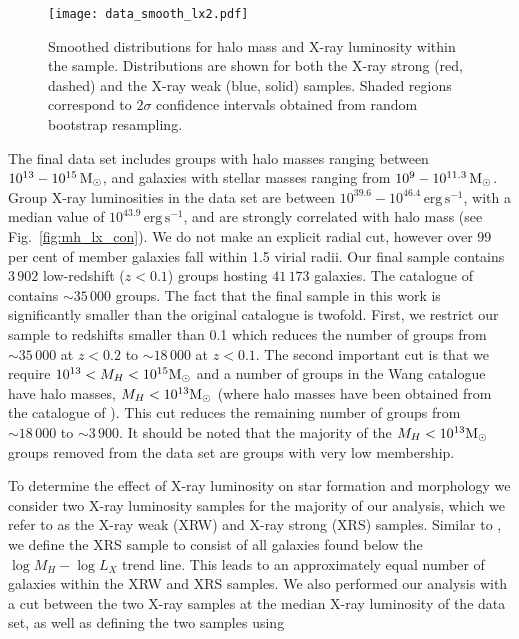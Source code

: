 \begin{figure}[!ht]
  \centering
  \texttt{[image: data\_smooth\_lx2.pdf]}
  \caption{Smoothed distributions for halo mass and X-ray luminosity
    within the sample.  Distributions are shown for both the X-ray
    strong (red, dashed) and the X-ray weak (blue, solid) samples.
    Shaded regions correspond to $2\sigma$ confidence intervals
    obtained from random bootstrap resampling.}
  \label{fig:data_smooth_lx2}
\end{figure} 

The final data set includes groups with halo masses ranging between
$10^{13} - 10^{15}\,\mathrm{M_{\odot}}$, and galaxies with stellar masses ranging
from $10^9 - 10^{11.3}\,\mathrm{M_{\odot}}$.  Group X-ray luminosities in the data
set are between $10^{39.6} -
10^{46.4}\,\mathrm{erg}\,\mathrm{s^{-1}}$, with a median value of
$10^{43.9}\,\mathrm{erg}\,\mathrm{s^{-1}}$, and are strongly
correlated with halo mass (see Fig.~\ref{fig:mh_lx_con}).  We do not
make an explicit radial cut, however over 99 per cent of member
galaxies fall within 1.5 virial radii.  Our final sample contains
$3\,902$ low-redshift ($z < 0.1$) groups hosting $41\,173$ galaxies.
The catalogue of \citet{wang2014} contains $\sim 35\,000$ groups.  The
fact that the final sample in this work is significantly smaller than
the original catalogue is twofold.  First, we restrict our sample to
redshifts smaller than 0.1 which reduces the number of groups from
$\sim 35\,000$ at $z < 0.2$ to $\sim 18\,000$ at $z < 0.1$.  The
second important cut is that we require $10^{13} < M_H < 10^{15}\mathrm{M_{\odot}}$
and a number of groups in the Wang catalogue have halo masses, $M_H <
10^{13}\mathrm{M_{\odot}}$ (where halo masses have been obtained from the catalogue
of \citealt{yang2007}).  This cut reduces the remaining number of
groups from $\sim 18\,000$ to $\sim 3\,900$.  It should be noted that
the majority of the $M_H < 10^{13}\mathrm{M_{\odot}}$ groups removed from the data
set are groups with very low membership.
\par
To determine the effect of X-ray luminosity on star formation and
morphology we consider two X-ray luminosity samples for the majority
of our analysis, which we refer to as the X-ray weak (XRW) and X-ray
strong (XRS) samples.  Similar to \citet{wang2014}, we define the XRS
sample to consist of all galaxies found below the $\log M_H - \log
L_X$ trend line.  This leads to an approximately equal number of
galaxies within the XRW and XRS samples.  We also performed our
analysis with a cut between the two X-ray samples at the median X-ray
luminosity of the data set, as well as defining the two samples using
